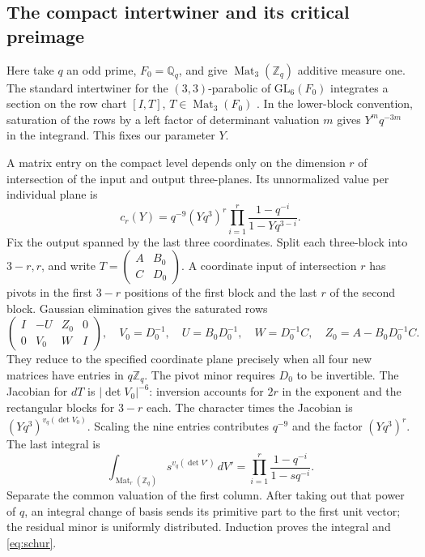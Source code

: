 \documentclass[11pt]{article}
\begin{document}
\subsection{The compact intertwiner and its critical preimage}
Here take $q$ an odd prime, $F_0=\mathbb Q_q$, and give
$\operatorname{Mat}_3(\mathbb Z_q)$ additive measure one. The standard
intertwiner for the $(3,3)$-parabolic of $\mathrm{GL}_6(F_0)$ integrates
a section on the row chart $[I,T]$, $T\in\operatorname{Mat}_3(F_0)$
\cite[\S11]{SU}. In the lower-block convention, saturation of the rows
by a left factor of determinant valuation $m$ gives $Y^mq^{-3m}$ in
the integrand. This fixes our parameter $Y$.

A matrix entry on the compact level depends only on the dimension
$r$ of intersection of the input and output three-planes. Its
unnormalized value per individual plane is
\begin{equation}\label{eq:schur}
 c_r(Y)=q^{-9}(Yq^3)^r\prod_{i=1}^{r}\frac{1-q^{-i}}{1-Yq^{3-i}} .
\end{equation}
Fix the output spanned by the last three coordinates. Split each
three-block into $3-r,r$, and write
$T=\left(\begin{smallmatrix}A&B_0\\C&D_0\end{smallmatrix}\right)$.
A coordinate input of intersection $r$ has pivots in the first $3-r$
positions of the first block and the last $r$ of the second block.
Gaussian elimination gives the saturated rows
\[
 \begin{pmatrix}I&-U&Z_0&0\\0&V_0&W&I\end{pmatrix},
 \quad V_0=D_0^{-1},\quad U=B_0D_0^{-1},\quad
 W=D_0^{-1}C,\quad Z_0=A-B_0D_0^{-1}C .
\]
They reduce to the specified coordinate plane precisely when all
four new matrices have entries in $q\mathbb Z_q$. The pivot minor
requires $D_0$ to be invertible. The Jacobian for $dT$ is
$|\det V_0|^{-6}$: inversion accounts for $2r$ in the exponent and
the rectangular blocks for $3-r$ each. The character times the
Jacobian is $(Yq^3)^{v_q(\det V_0)}$. Scaling the nine entries
contributes $q^{-9}$ and the factor $(Yq^3)^r$. The last integral is
\[
 \int_{\operatorname{Mat}_r(\mathbb Z_q)}
 s^{v_q(\det V')}\,dV'=\prod_{i=1}^r\frac{1-q^{-i}}{1-sq^{-i}}.
\]
Separate the common valuation of the first column. After taking out
that power of $q$, an integral change of basis sends its primitive
part to the first unit vector; the residual minor is uniformly
distributed. Induction proves the integral and \eqref{eq:schur}.
\end{document}
